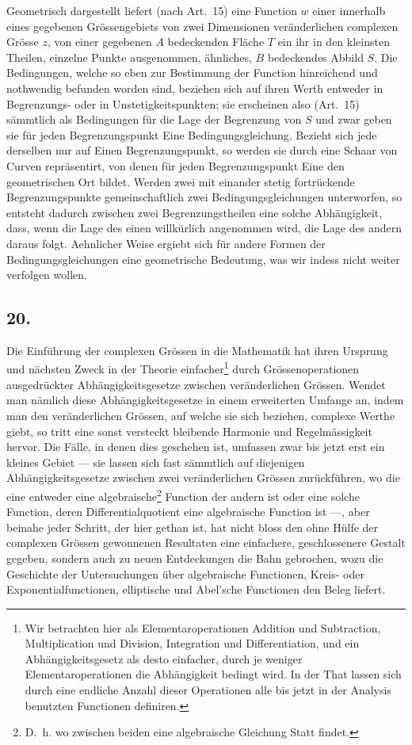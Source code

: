 \documentclass[12pt,a4paper]{book}
\theoremstyle{definition}
\theoremstyle{remark}
\begin{document}
Geometrisch dargestellt liefert (nach Art.~15) eine Function $w$ einer innerhalb eines gegebenen Grössengebiets von zwei Dimensionen veränderlichen complexen Grösse $z$, von einer gegebenen $A$ bedeckenden Fläche $T$ ein ihr in den kleinsten Theilen, einzelne Punkte ausgenommen, ähnliches, $B$ bedeckendes Abbild $S$. Die Bedingungen, welche so eben zur Bestimmung der Function hinreichend und nothwendig befunden worden sind, beziehen sich auf ihren Werth entweder in Begrenzungs- oder in Unstetigkeitspunkten; sie erscheinen also (Art.~15) sämmtlich als Bedingungen für die Lage der Begrenzung von $S$ und zwar geben sie für jeden Begrenzungspunkt Eine Bedingungsgleichung. Bezieht sich jede derselben nur auf Einen Begrenzungspunkt, so werden sie durch eine Schaar von Curven repräsentirt, von denen für jeden Begrenzungspunkt Eine den geometrischen Ort bildet. Werden zwei mit einander stetig fortrückende Begrenzungspunkte gemeinschaftlich zwei Bedingungsgleichungen unterworfen, so entsteht dadurch zwischen zwei Begrenzungstheilen eine solche Abhängigkeit, dass, wenn die Lage des einen willkürlich angenommen wird, die Lage des andern daraus folgt. Aehnlicher Weise ergiebt sich für andere Formen der Bedingungsgleichungen eine geometrische Bedeutung, was wir indess nicht weiter verfolgen wollen.

\subsection*{20.}

Die Einführung der complexen Grössen in die Mathematik hat ihren Ursprung und nächsten Zweck in der Theorie einfacher\footnote{Wir betrachten hier als Elementaroperationen Addition und Subtraction, Multiplication und Division, Integration und Differentiation, und ein Abhängigkeitsgesetz als desto einfacher, durch je weniger Elementaroperationen die Abhängigkeit bedingt wird. In der That lassen sich durch eine endliche Anzahl dieser Operationen alle bis jetzt in der Analysis benutzten Functionen definiren.} durch Grössenoperationen ausgedrückter Abhängigkeitsgesetze zwischen veränderlichen Grössen. Wendet man nämlich diese Abhängigkeitsgesetze in einem erweiterten Umfange an, indem man den veränderlichen Grössen, auf welche sie sich beziehen, complexe Werthe giebt, so tritt eine sonst versteckt bleibende Harmonie und Regelmässigkeit hervor. Die Fälle, in denen dies geschehen ist, umfassen zwar bis jetzt erst ein kleines Gebiet --- sie lassen sich fast sämmtlich auf diejenigen Abhängigkeitsgesetze zwischen zwei veränderlichen Grössen zurückführen, wo die eine entweder eine algebraische\footnote{D.~h. wo zwischen beiden eine algebraische Gleichung Statt findet.} Function der andern ist oder eine solche Function, deren Differentialquotient eine algebraische Function ist ---, aber beinahe jeder Schritt, der hier gethan ist, hat nicht bloss den ohne Hülfe der complexen Grössen gewonnenen Resultaten eine einfachere, geschlossenere Gestalt gegeben, sondern auch zu neuen Entdeckungen die Bahn gebrochen, wozu die Geschichte der Untersuchungen über algebraische Functionen, Kreis- oder Exponentialfunctionen, elliptische und Abel'sche Functionen den Beleg liefert.
\end{document}
